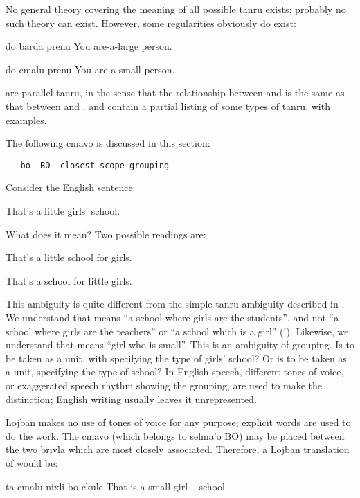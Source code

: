 No general theory covering the meaning of all possible tanru
    exists; probably no such theory can exist. However, some
    regularities obviously do exist:
\begin{example}
do barda prenu\n
You are-a-large person.
\end{example}

\begin{example}
do cmalu prenu\n
You are-a-small person.
\end{example}

{\noindent}are parallel tanru, in the sense that the relationship between
     and  is the same as that between 
    and .  and  contain a partial listing of some
    types of tanru, with examples.



The following cmavo is discussed in this section:
\begin{verbatim}
   bo  BO  closest scope grouping
\end{verbatim}
    Consider the English sentence:
\begin{example}
That's a little girls' school.
\end{example}

What does it mean? Two possible readings are:
\begin{example}
That's a little school for girls.
\end{example}

\begin{example}
That's a school for little girls.
\end{example}

This ambiguity is quite different from the simple tanru
    ambiguity described in . We
    understand that  means ``a school where girls
    are the students'', and not ``a school where girls are the
    teachers'' or ``a school which is a girl'' (!). Likewise, we
    understand that  means ``girl who is small''.
    This is an ambiguity of grouping. Is  to be
    taken as a unit, with  specifying the type of girls'
    school? Or is  to be taken as a unit, specifying
    the type of school? In English speech, different tones of
    voice, or exaggerated speech rhythm showing the grouping, are
    used to make the distinction; English writing usually leaves it
    unrepresented. 

Lojban makes no use of tones of voice for any purpose;
    explicit words are used to do the work. The cmavo  (which
    belongs to selma'o BO) may be placed between the two brivla
    which are most closely associated. Therefore, a Lojban
    translation of  would be:
\begin{example}
ta cmalu nixli bo ckule\n
That is-a-small girl -- school.
\end{example}

